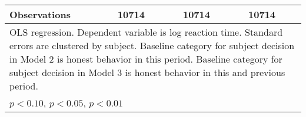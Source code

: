 {\begin{tabular}{l*{3}{cc}}
\hline
Observations    &    10714         &         &    10714         &         &    10714         &         \\
\hline\hline
\multicolumn{7}{l}{\footnotesize OLS regression. Dependent variable is log reaction time. Standard errors are clustered by subject. Baseline category for subject decision in Model 2 is honest behavior in this period. Baseline category for subject decision in Model 3 is honest behavior in this and previous period.}\\
\multicolumn{7}{l}{\footnotesize \sym{*} \(p<0.10\), \sym{**} \(p<0.05\), \sym{***} \(p<0.01\)}\\
\end{tabular}
}
